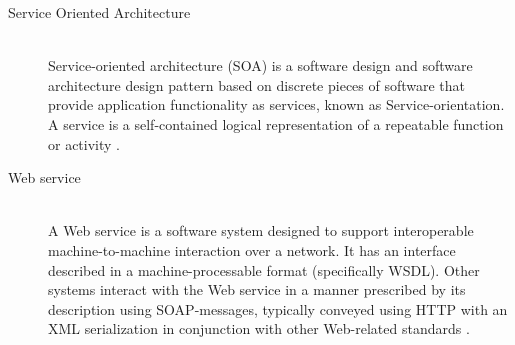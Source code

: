 \begin{description}

 
 \item[Service Oriented Architecture] \hfill \\
 Service-oriented architecture (SOA) is a software design and software architecture design pattern based on discrete pieces of software that provide application functionality as services, known as Service-orientation. A service is a self-contained logical representation of a repeatable function or activity \cite{SOAonline}.   
 
  

 \item[Web service] \hfill \\
A Web service is a software system designed to support interoperable machine-to-machine interaction over a network. It has an interface described in a machine-processable format (specifically WSDL). Other systems interact with the Web service in a manner prescribed by its description using SOAP-messages, typically conveyed using HTTP with an XML serialization in conjunction with other Web-related standards \cite{WSOnline}.

\end{description}
\label{chapter:ThisIsMyAppendixChapter}
